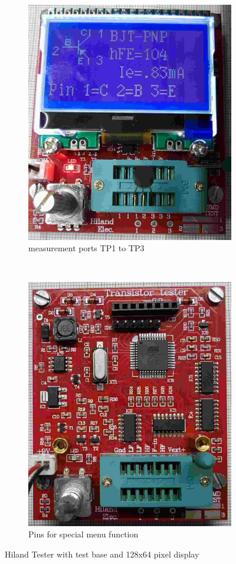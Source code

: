 \begin{figure}[H]
  \begin{subfigure}[b]{.5\textwidth}
    \centering
    \includegraphics[width=.875\textwidth]{../PNG/Hi_u.jpg}
    \caption{measurement ports TP1 to TP3}
  \end{subfigure}
  ~
  \begin{subfigure}[b]{.5\textwidth}
    \centering
    \includegraphics[width=.756\textwidth]{../PNG/Hi_o.jpg}
    \caption{Pins for special menu function}
  \end{subfigure}
  \vspace{-0.2cm}
  \caption{Hiland Tester with test base and 128x64 pixel display}
  \label{fig:Hiland}
\end{figure}

